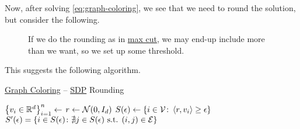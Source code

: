 Now, after solving \autoref{eq:graph-coloring}, we see that we need to round the solution, but consider the following.

\begin{figure}[H]
	\centering
	\caption{If we do the rounding as in \hyperref[prb:max-cut]{max cut}, we may end-up include more than we want, so we set up some threshold.}
	\label{fig:3-coloring-threshold}
\end{figure}

This suggests the following algorithm.

\begin{algorithm}[H]\label{algo:graph-coloring-SDP-rounding}
	\DontPrintSemicolon
	\caption{\hyperref[prb:graph-coloring]{Graph Coloring} -- \hyperref[def:SDP]{SDP} Rounding}
	\BlankLine
	\(\left\{ v_i \in \mathbb{\MakeUppercase{r}} ^d\right\} _{i=1}^n \gets\)\;
	\(r \gets \mathcal{\MakeUppercase{n}} (0, I_d)\)
	\(S(\epsilon )\gets\left\{ i\in \mathcal{\MakeUppercase{v}} \colon \left\langle r, v_i \right\rangle \geq \epsilon   \right\} \)
	\(S^\prime (\epsilon )= \left\{ i\in S(\epsilon )\colon \nexists j\in S(\epsilon ) \text{ s.t. } (i, j)\in \mathcal{\MakeUppercase{e}} \right\} \)\;
	\;
\end{algorithm}